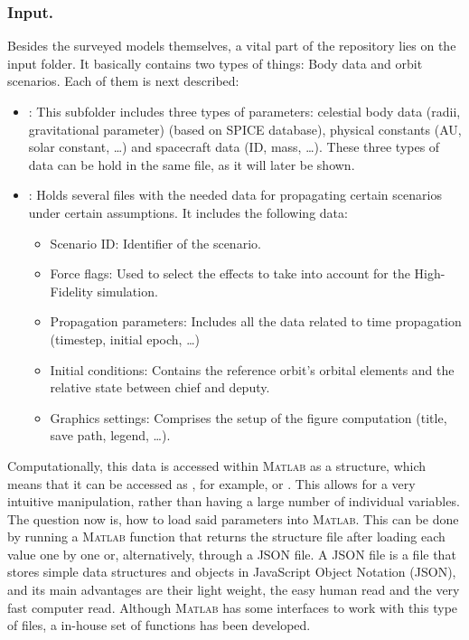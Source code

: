 		\subsubsection{Input.}
		\indent Besides the surveyed models themselves, a vital part of the repository lies on the input folder. It basically contains two types of things: Body data and orbit scenarios. Each of them is next described:
		\begin{itemize}
		\item[\GMVred{1.}]: This subfolder includes three types of parameters: celestial body data (\eg radii, gravitational parameter) (based on SPICE database), physical constants (\eg AU, solar constant, \ldots) and spacecraft data (\eg ID, mass, \ldots). These three types of data can be hold in the same file, as it will later be shown.
		\item[\GMVred{2.}]: Holds several files with the needed data for propagating certain scenarios under certain assumptions. It includes the following data:
			\begin{itemize}
			\item Scenario ID: Identifier of the scenario.
			\item Force flags: Used to select the effects to take into account for the High-Fidelity simulation.
			\item Propagation parameters: Includes all the data related to time propagation (\eg timestep, initial epoch, \ldots)
			\item Initial conditions: Contains the reference orbit's orbital elements and the relative state between chief and deputy.
			\item Graphics settings: Comprises the setup of the figure computation (\eg title, save path, legend, \ldots).
			\end{itemize}
		\end{itemize}
		\indent Computationally, this data is accessed within \textsc{Matlab} as a structure, which means that it can be accessed as , for example, or . This allows for a very intuitive manipulation, rather than having a large number of individual variables. \\
		\indent The question now is, how to load said parameters into \textsc{Matlab}. This can be done by running a \textsc{Matlab} function that returns the structure file after loading each value one by one or, alternatively, through a JSON file. A JSON file is a file that stores simple data structures and objects in JavaScript Object Notation (JSON), and its main advantages are their light weight, the easy human read and the very fast computer read. Although \textsc{Matlab} has some interfaces to work with this type of files, a in-house set of functions has been developed.
